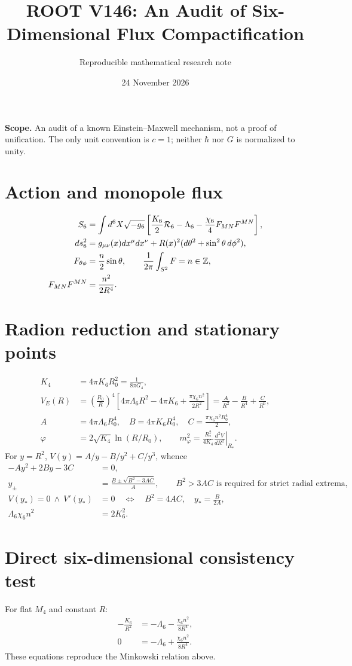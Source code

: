 \documentclass[11pt]{article}
\title{ROOT V146: An Audit of Six-Dimensional Flux Compactification}
\author{Reproducible mathematical research note}
\date{24 November 2026}
\begin{document}
\maketitle
\noindent\textbf{Scope.} An audit of a known Einstein--Maxwell mechanism, not a proof of unification. The only unit convention is $c=1$; neither $\hbar$ nor $G$ is normalized to unity.
\section{Action and monopole flux}
\begin{align}
S_6&=\int d^6X\sqrt{-g_6}\left[\frac{K_6}{2}{\cal R}_6-\Lambda_6-\frac{\chi_6}{4}F_{MN}F^{MN}\right],\\
ds_6^2&=g_{\mu\nu}(x)dx^\mu dx^\nu+R(x)^2(d\theta^2+\sin^2\theta\,d\phi^2),\\
F_{\theta\phi}&=\frac n2\sin\theta,\qquad \frac1{2\pi}\int_{S^2}F=n\in\mathbb Z,\\
F_{MN}F^{MN}&=\frac{n^2}{2R^4}.
\end{align}
\section{Radion reduction and stationary points}
\begin{align}
K_4&=4\pi K_6R_0^2=\frac1{8\pi G_4},\\
V_E(R)&=\left(\frac{R_0}{R}\right)^4 \left[4\pi\Lambda_6R^2-4\pi K_6+\frac{\pi\chi_6n^2}{2R^2}\right]
=\frac A{R^2}-\frac B{R^4}+\frac C{R^6},\\
A&=4\pi\Lambda_6R_0^4,\quad B=4\pi K_6R_0^4,\quad C=\frac{\pi\chi_6n^2R_0^4}{2},\\
\varphi&=2\sqrt{K_4}\ln(R/R_0),\qquad
m_\varphi^2=\frac{R_*^2}{4K_4}\left.\frac{d^2V}{dR^2}\right|_{R_*}.
\end{align}
For $y=R^2$, $V(y)=A/y-B/y^2+C/y^3$, whence
\begin{align}
-Ay^2+2By-3C&=0,\\
y_\pm&=\frac{B\pm\sqrt{B^2-3AC}}A,\qquad
B^2>3AC\text{ is required for strict radial extrema},\\
V(y_*)=0\ \land\ V'(y_*)&=0\quad\Longleftrightarrow\quad B^2=4AC,
\quad y_*=\frac{B}{2A},\\
\Lambda_6\chi_6n^2&=2K_6^2.
\end{align}
\section{Direct six-dimensional consistency test}
For flat $M_4$ and constant $R$:
\begin{align}
-\frac{K_6}{R^2}&=-\Lambda_6-\frac{\chi_6n^2}{8R^4},\\
0&=-\Lambda_6+\frac{\chi_6n^2}{8R^4}.
\end{align}
These equations reproduce the Minkowski relation above.
\end{document}
